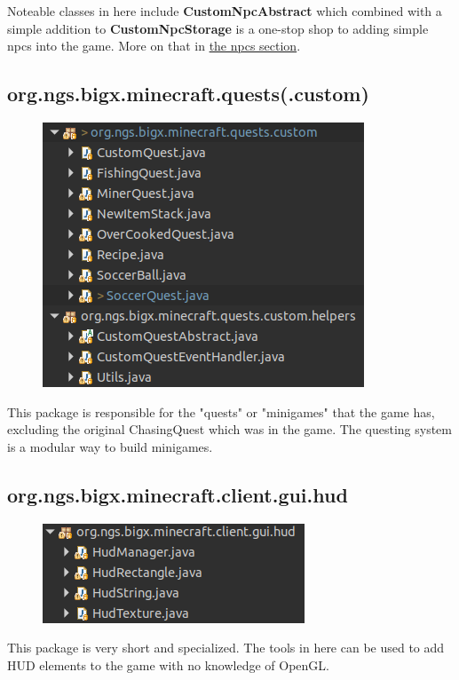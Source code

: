 \documentclass[12pt]{article}
\begin{document}
Noteable classes in here include {\bfseries CustomNpcAbstract} which combined with a simple addition to {\bfseries CustomNpcStorage} is a one-stop shop to adding simple npcs into the game. More on that in \hyperref[sec:npcs]{the npcs section}.

\subsection{org.ngs.bigx.minecraft.quests(.custom)}
\begin{figure}[h]
	\includegraphics[scale=0.5]{images/tour/orgNgsBigxMinecraftQuestsCustom.png}
	\centering
\end{figure}

This package is responsible for the "quests" or "minigames" that the game has, excluding the original ChasingQuest which was in the game. The questing system is a modular way to build minigames.

\subsection{org.ngs.bigx.minecraft.client.gui.hud}
\begin{figure}[h]
	\includegraphics[scale=0.5]{images/tour/orgNgsBigxMinecraftClientGuiHud.png}
	\centering
\end{figure}

This package is very short and specialized. The tools in here can be used to add HUD elements to the game with no knowledge of OpenGL.
\end{document}
